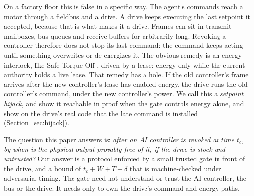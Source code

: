 \documentclass[letterpaper]{article} %
\begin{document}
On a factory floor this is false in a specific way. The agent's commands reach a motor through a
fieldbus and a drive. A drive keeps executing the last setpoint it accepted, because that is what
makes it a drive. Frames can sit in transmit mailboxes, bus queues and receive buffers for
arbitrarily long. Revoking a controller therefore does not stop its last command: the command
keeps acting until something overwrites or de-energizes it. The obvious remedy is an energy
interlock, like Safe Torque Off \citep{iec61800}, driven by a lease: energy only while the current
authority holds a live lease. That remedy has a hole. If the old controller's frame arrives after
the new controller's lease has enabled energy, the drive runs the old controller's command, under
the new controller's power. We call this a \emph{setpoint hijack}, and show it reachable in proof
when the gate controls energy alone, and show on the drive's real code that the late command is
installed (Section~\ref{sec:hijack}).

The question this paper answers is: \emph{after an AI controller is revoked at time $t_c$, by when
is the physical output provably free of it, if the drive is stock and untrusted?} Our answer is a
protocol enforced by a small trusted gate in front of the drive, and a bound of
$t_c + W + T + \delta$ that is machine-checked under adversarial timing. The gate need not
understand or trust the AI controller, the bus or the drive. It needs only to own the drive's
command and energy paths.
\end{document}

